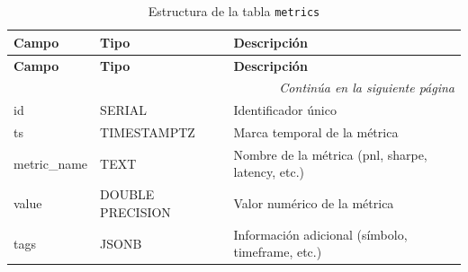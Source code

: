 \begin{longtable}{l l l}
\caption{Estructura de la tabla \texttt{metrics}} \\
\toprule
\textbf{Campo} & \textbf{Tipo} & \textbf{Descripción} \\
\midrule
\endfirsthead

\toprule
\textbf{Campo} & \textbf{Tipo} & \textbf{Descripción} \\
\midrule
\endhead

\midrule
\multicolumn{3}{r}{\textit{Continúa en la siguiente página}} \\
\midrule
\endfoot

\bottomrule
\endlastfoot

id           & SERIAL            & Identificador único \\
ts           & TIMESTAMPTZ       & Marca temporal de la métrica \\
metric\_name & TEXT              & Nombre de la métrica (pnl, sharpe, latency, etc.) \\
value        & DOUBLE PRECISION  & Valor numérico de la métrica \\
tags         & JSONB             & Información adicional (símbolo, timeframe, etc.) \\
\end{longtable}